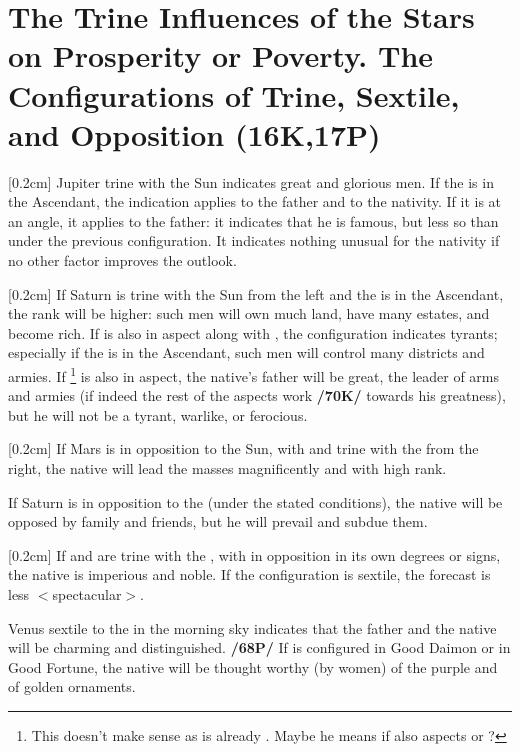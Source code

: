 \section{The Trine Influences of the Stars on Prosperity or Poverty. The Configurations of Trine, Sextile, and Opposition (16K,17P)}

\marginnote{\Jupiter \Trine \Sun}[0.2cm]
Jupiter trine with the Sun indicates great and glorious men. If the \Sun\xspace is in the Ascendant, the
indication applies to the father and to the nativity. If it is at an angle, it applies to the father: it indicates that he is famous, but less so than under the previous configuration. It indicates nothing unusual for the nativity if no other factor improves the outlook. 

\marginnote{\Saturn \Trine \Sun}[0.2cm]
If Saturn is trine with the Sun from the left and the \Sun\xspace is in the Ascendant, the rank will be higher: such men will own much land, have many estates, and become rich. If \Mars\xspace is also in aspect along with \Jupiter, the configuration indicates tyrants; especially if the \Sun\xspace is in the Ascendant, such men will control many districts and armies. If \Saturn\xspace
\footnote{This doesn't make sense as \Saturn\xspace is already \Trine\Sun. Maybe he means if \Saturn\xspace also aspects \Mars\xspace or \Jupiter?}
is also in aspect, the native’s father will be great, the leader of arms and armies (if indeed the rest of the aspects work \textbf{/70K/} towards his greatness), but he will not be a tyrant, warlike, or ferocious.

\marginnote{\Mars \Opposition \Sun}[0.2cm]
If Mars is in opposition to the Sun, with \Jupiter\xspace and \Saturn\xspace trine with the \Sun\xspace from the right, the native will lead the masses magnificently and with high rank. 

If Saturn is in opposition to the \Sun\xspace (under the stated conditions), the native will be opposed by family and friends, but he will prevail and subdue
them. 

\marginnote{\Saturn\xspace \Mars \Trine \Sun}[0.2cm]
If \Saturn\xspace and \Mars\xspace are trine with the \Sun, with \Jupiter\xspace in opposition in its own degrees or signs, the native is imperious and noble. If the configuration is sextile, the forecast is less $<$spectacular$>$.


Venus \marginnote{\Venus \Sextile \Sun} sextile to the \Sun\xspace in the morning sky indicates that the father and the native will be charming and distinguished. \textbf{/68P/} If \Venus\xspace is configured in Good Daimon or in Good Fortune, the native will be thought worthy (by women) of the purple and of golden ornaments.


